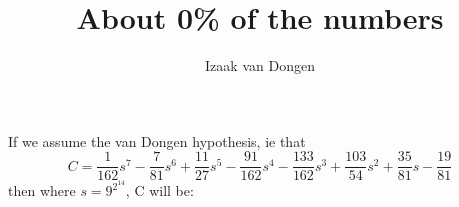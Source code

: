 \documentclass[fleqn,a4paper,11pt]{article}
\title{About 0\% of the numbers}
\author{Izaak van Dongen}
\begin{document}
\maketitle\thispagestyle{empty} %

If we assume the van Dongen hypothesis, ie that
\begin{equation*}
C = \frac{1}{162}s^7 - \frac{7}{81}s^6 + \frac{11}{27}s^5 - \frac{91}{162}s^4
    - \frac{133}{162}s^3 + \frac{103}{54}s^2 + \frac{35}{81}s - \frac{19}{81}
\end{equation*}
then where \(s = 9^{2^{14}}\), C will be:


\end{document}
